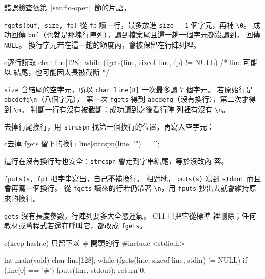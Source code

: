 錯誤檢查依第~\ref{sec:fio-open}~節的片語。

\texttt{fgets(buf, size, fp)} 從 \texttt{fp} 讀一行，最多放進
\texttt{size - 1} 個字元，再補 \texttt{\textbackslash 0}。 成功回傳
\texttt{buf}（也就是那塊行陣列），讀到檔案尾且這一趟一個字元都沒讀到，
回傳 \texttt{NULL}。 換行字元若在這一趟的額度內，會被保留在行陣列裡。

\begin{code}{c}{逐行讀取}
char line[128];
while (fgets(line, sizeof line, fp) != NULL) {
    /* line 可能以 \n 結尾，也可能因太長被截斷 */
}
\end{code}

\texttt{size} 含結尾的空字元，所以 \texttt{char line[8]} 一次最多讀
$7$ 個字元。 若原始行是 \texttt{abcdefg\textbackslash n}（八個字元），
第一次 \texttt{fgets} 得到 \texttt{abcdefg}（沒有換行），第二次才得到
\texttt{\textbackslash n}。 判斷一行有沒有被截斷：成功讀到之後看行陣
列裡有沒有 \texttt{\textbackslash n}。

去掉行尾換行，用 \texttt{strcspn} 找第一個換行的位置，再寫入空字元：

\begin{code}{c}{去掉 fgets 留下的換行}
line[strcspn(line, "\n")] = '\0';
\end{code}

這行在沒有換行時也安全：\texttt{strcspn} 會走到字串結尾，等於沒改內
容。

\texttt{fputs(s, fp)} 把字串寫出，自己\textbf{不}補換行。 相對地，
\texttt{puts(s)} 寫到 \texttt{stdout} 而且\textbf{會}再寫一個換行。
從 \texttt{fgets} 讀來的行若仍帶著 \texttt{\textbackslash n}，用
\texttt{fputs} 抄出去就會維持原來的換行。

\texttt{gets} 沒有長度參數，行陣列要多大全憑運氣。 C11 已把它從標準
裡刪除；任何教材或舊程式若還在呼叫它，都改成 \texttt{fgets}。

\begin{example}[label=ex:fio-keep-hash]{c}{(keep-hash.c) 只留下以 \# 開頭的行}
#include <stdio.h>

int main(void) {
    char line[128];
    while (fgets(line, sizeof line, stdin) != NULL) {
        if (line[0] == '#') {
            fputs(line, stdout);
        }
    }
    return 0;
}
\end{example}


